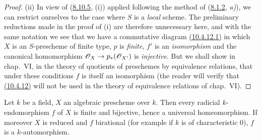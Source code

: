 \begin{proof}
\textup{(ii)} In view of
({\hyperref[IV.8.10.5]{8.10.5}}, (i)) applied following the
method of ({\hyperref[IV.8.1.2]{8.1.2}}, \emph{a)}), we can
restrict ourselves to the case where $S$ is a \emph{local} scheme. The preliminary reductions
made in the proof of (i) are therefore unnecessary here, and with the same
notation we see that we have a commutative diagram
{\hyperref[IV.10.4.12.1]{(10.4.12.1)}} in which $X$ is
an $S$-prescheme of finite type, $p$ is \emph{finite}, $f'$ is an \emph{isomorphism} and
the canonical homomorphism $\mathscr{O}_X\to p_*(\mathscr{O}_{X'})$ is \emph{injective}.
But we shall show in chap.~VI, in the theory of quotients of
preschemes by equivalence relations, that under these conditions $f$
is itself an isomorphism (the reader will verify that
{\hyperref[IV.10.4.12]{(10.4.12)}} will not be used in the theory of
equivalence relations of chap.~VI).
\end{proof}

\begin{corollary}[10.4.13]
\label{IV.10.4.13}
Let $k$ be a field, $X$ an algebraic prescheme over $k$. Then every
radicial $k$-endomorphism $f$ of $X$ is finite and bijective, hence a
universal homeomorphism. If moreover $X$ is reduced and $f$ birational
\textup{(for example if $k$ is of characteristic $0$)}, $f$ is a
$k$-automorphism.
\end{corollary}

